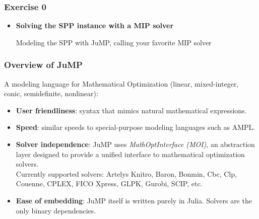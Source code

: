 \documentclass[]{beamer}
\newcommand*{\blue}[1]{\textcolor{nblue}{#1}}
\begin{document}
% 
%

\begin{frame}
  \frametitle{Exercise 0}
\vspace{3mm}

\begin{itemize}
\item \textbf{Solving the SPP instance with a MIP solver}
\smallskip

Modeling the SPP with JuMP, calling your favorite MIP solver
\medskip

\vspace{8mm}

\end{itemize}


\end{frame}

% 
%

\begin{frame}
  \frametitle{Overview of JuMP}
\vspace{3mm}


A modeling language for Mathematical Optimization (linear, mixed-integer, conic, semidefinite, nonlinear):
\pause

\begin{itemize}
\item \blue{\textbf{User friendliness}}:
syntax that mimics natural mathematical expressions.
\medskip
\pause

\item \blue{\textbf{Speed}}:
similar speeds to special-purpose modeling languages such as AMPL.
\medskip
\pause

\item \blue{\textbf{Solver independence}}:
JuMP uses \textit{MathOptInterface (MOI)},  an abstraction layer designed to provide a unified interface to mathematical optimization solvers. \\
\medskip
Currently supported solvers: Artelys Knitro, Baron, Bonmin, Cbc, Clp, Couenne, CPLEX, FICO Xpress, GLPK, Gurobi, SCIP, etc.
\medskip
\pause

\item \blue{\textbf{Ease of embedding}}:
JuMP itself is written purely in Julia. Solvers are the only binary dependencies.

\end{itemize}

\end{frame}
\end{document}
